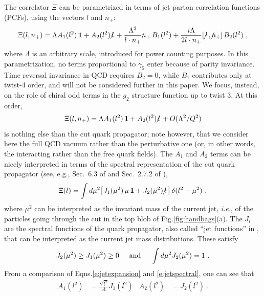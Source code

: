 \documentclass[preprintnumbers,floatfix,nofootinbib]{revtex4}
\newcommand{\lslash}{l \hspace{-0.19cm} / \,}
\newcommand{\nslash}{n \hspace{-0.24cm} / \,}
\newcommand{\id}{{\bm 1}
}
\begin{document}
The correlator $\Xi$ can be parametrized in terms of jet parton correlation
functions (PCFs), using the vectors $l$ and $n_+$: 
\begin{equation}
\Xi(l,n_+) = \Lambda A_1(l^2)\,\id + A_2(l^2)\,\lslash 
+ \frac{\Lambda^2}{l \cdot n_{+}} \nslash_+ \, B_{1}(l^2)
+ \frac{i \Lambda}{2 l \cdot n_{+}} [\,\lslash,\nslash_+ ] \, B_{2}(l^2) \ ,
\label{e:jetexpansion}
\end{equation} 
where $\Lambda$ is an arbitrary scale, introduced for power counting purposes.
In this parametrization, no terms proportional to $\gamma_5$ enter because of parity invariance. Time reversal invariance in QCD requires $B_{2}=0$, while $B_{1}$ contributes only at twist-4 order, and will not be considered further in this paper. We focus, instead, on the role of chiral odd terms in the $g_2$ structure function up to twist 3. At this order, 
\begin{equation}
  \Xi(l,n_+) = \Lambda A_1(l^2)\,\id + A_2(l^2)\,\lslash 
    + O(\Lambda^2/Q^2)
\label{e:jetexpansion-tw3}
\end{equation} 
is nothing else than the cut quark propagator; note however, that we consider
here the full QCD vacuum rather than the perturbative one (or, in other words, the interacting rather than the free quark fields).
The $A_1$ and $A_2$ terms can be nicely interpreted in terms of the spectral
representation of the cut quark propagator (see, e.g., Sec.~6.3 of
\cite{D'Hoker:2004aa} and Sec.~2.7.2 of \cite{Romao:2013aa}),
\begin{align} 
  \Xi(l) =  
  \int d \mu^2 \big[ J_1 (\mu^2)\,\mu\,\id + J_2 (\mu^2)\,\lslash \big] \,
  \delta(l^2 -\mu^2) \ ,
\label{e:jetspectral}
\end{align}
where $\mu^2$ can be interpreted as the invariant mass of the current jet, {\it
  i.e.}, of the particles going through the cut in the top blob of
Fig.\ref{fig:handbags}(a). The $J_i$ are the spectral functions of the
quark propagator, also called ``jet functions'' in
\cite{Accardi:2008ne}, that can be interpreted as the current jet mass distributions. These satisfy
\begin{align}
  J_2(\mu^2) \geq J_1(\mu^2) \geq 0
  \hspace*{0.5cm} \text{and} \hspace*{0.5cm}
  \int d\mu^2 J_2(\mu^2) = 1 \ .
\label{eq:jetfnsprops}
\end{align}
From a comparison of Eqns.\eqref{e:jetexpansion} and \eqref{e:jetspectral}, one can see that 
\begin{align}
  A_1(l^2)&=\frac{\sqrt{l^2}}{\Lambda}J_1(l^2) & A_2(l^2)&=J_2(l^2) \ .
  \label{eq:jet_vs_spectral}
\end{align}
\end{document}
